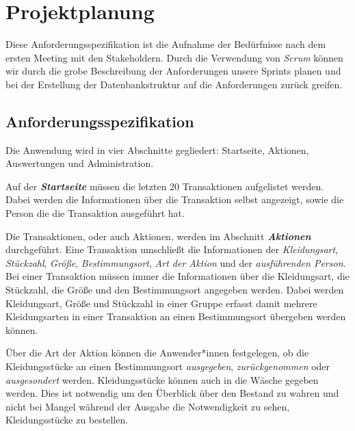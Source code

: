 \section{Projektplanung}\label{sec:Projektplanung}

Diese Anforderungsspezifikation ist die Aufnahme der Bedürfnisse nach dem ersten Meeting mit den Stakeholdern. Durch die Verwendung von \textit{Scrum} können wir durch die grobe Beschreibung der Anforderungen unsere Sprints planen und bei der Erstellung der Datenbankstruktur auf die Anforderungen zurück greifen. 


\subsection{Anforderungsspezifikation}\label{sec:anforderungen}

Die Anwendung wird in vier Abschnitte gegliedert: Startseite, Aktionen, Auswertungen und Administration.

Auf der \textit{\textbf{Startseite}} müssen die letzten 20 Transaktionen aufgelistet werden. Dabei werden die Informationen über die Transaktion selbst angezeigt, sowie die Person die die Transaktion ausgeführt hat.

Die Transaktionen, oder auch Aktionen, werden im Abschnitt \textit{\textbf{Aktionen}} durchgeführt. Eine Transaktion umschließt die Informationen der \textit{Kleidungsart}, \textit{Stückzahl}, \textit{Größe}, \textit{Bestimmungsort}, \textit{Art der Aktion} und der \textit{ausführenden Person}. Bei einer Transaktion müssen immer die Informationen über die Kleidungsart, die Stückzahl, die Größe und den Bestimmungsort angegeben werden. Dabei werden Kleidungsart, Größe und Stückzahl in einer Gruppe erfasst damit mehrere Kleidungsarten in einer Transaktion an einen Bestimmungsort übergeben werden können. 

Über die Art der Aktion können die Anwender*innen festgelegen, ob die Kleidungsstücke an einen Bestimmungsort \textit{ausgegeben}, \textit{zurückgenommen} oder \textit{ausgesondert} werden. Kleidungsstücke können auch in die Wäsche gegeben werden. Dies ist notwendig um den Überblick über den Bestand zu wahren und nicht bei Mangel während der Ausgabe die Notwendigkeit zu sehen, Kleidungsstücke zu bestellen.


